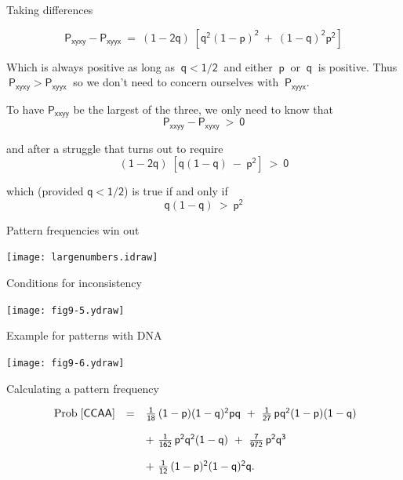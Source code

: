 \documentclass[bluish,slideColor,colorBG,pdf]{prosper}
\def\prob{{\rm \;Prob\;}}
\begin{document}
\begin{slide}[Replace]{Taking differences}

\noindent
\[
\mathsf{P_{xyxy} - P_{xyyx} \ =\ (1-2q)\;\left[q^2(1-p)^2\ +\ (1-q)^2p^2\right]}
\]
\medskip

Which is always positive as long as $\mathsf{~q < 1/2~}$ and either
$\mathsf{~p~}$ or $\mathsf{~q~}$ is positive.  Thus $\mathsf{~P_{xyxy} >
P_{xyyx}~}$ so we don't need to concern ourselves with $\ \mathsf{P_{xyyx}}$.
\bigskip

To have $\mathsf{P_{xxyy}}$ be the largest of the three, we only need to
know that
\[
\mathsf{P_{xxyy} - P_{xyxy}\ >\ 0}
\]

and after a struggle that turns out to require
\[
\mathsf{(1-2q)\;\left[q(1-q)\ -\ p^2 \right]\ >\ 0}
\]

which (provided $\mathsf{q < 1/2}$) is true if and only if
\[
\mathsf{q(1-q)\  >\  p^2}
\]

\end{slide}

\begin{slide}[Replace]{Pattern frequencies win out}
\bigskip

\centerline{\texttt{[image: largenumbers.idraw]}}

\end{slide}

\begin{slide}[Replace]{Conditions for inconsistency}

\centerline{\texttt{[image: fig9-5.ydraw]}}

\end{slide}

\begin{slide}[Replace]{Example for patterns with DNA}

\centerline{\texttt{[image: fig9-6.ydraw]}}

\end{slide}

\begin{slide}[Replace]{Calculating a pattern frequency}

\noindent
\[
\begin{array}{c c l}
\mathsf{\prob[CCAA]} & \mathsf{=} & \mathsf{\frac{1}{18}\,(1-p)(1-q)^2pq\ +\ \frac{1}{27}\,pq^2(1-p)(1-q)}\\
& & \\
& & \mathsf{+\ \frac{1}{162}\,p^2q^2(1-q)\ +\ \frac{7}{972}\,p^2q^3\ }\\
& & \\
& & \mathsf{+\ \frac{1}{12}\,(1-p)^2(1-q)^2q}.
\end{array}
\]

\end{slide}
\end{document}
